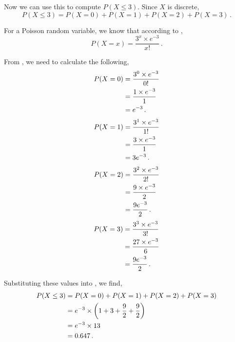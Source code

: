 \begin{subquestions}
\begin{subsubquestions}
Now we can use this to compute $P(X\leq3)$. Since $X$ is discrete, 
\begin{equation}
	P(X \leq 3) = P(X=0)+P(X=1)+P(X=2)+P(X=3) \,. \label{2005:q4:DisPois}
\end{equation}

For a Poisson random variable, we know that according to , 
\begin{equation}
	P(X = x) =\frac{ 3 ^ x \times e^{-3}}{x!} \,. \label{2005:q4:Pois1}
\end{equation}


From , we need to calculate the following,
\begin{align}
	P(X = 0) & = \frac{ 3 ^ 0 \times e^{-3}}{0!} \nonumber \\
	         & = \frac{ 1 \times e^{-3}}{1} \nonumber \\
	         & = e^{-3} \,. 
\end{align}
\begin{align}
	P(X = 1) & = \frac{ 3 ^ 1 \times e^{-3}}{1!} \nonumber \\
			 & = \frac{ 3 \times e^{-3}}{1} \nonumber \\
			 & = 3e^{-3} \,. 
\end{align}
\begin{align}
	P(X = 2) & = \frac{ 3 ^ 2 \times e^{-3}}{2!} \nonumber \\
			 & = \frac{ 9 \times e^{-3}}{2} \nonumber \\
			 & = \frac{9e^{-3}}{2} \,.
\end{align}
\begin{align}
	P(X = 3) & = \frac{ 3 ^ 3 \times e^{-3}}{3!} \nonumber \\
		  	 & = \frac{ 27 \times e^{-3}}{6} \nonumber \\
			 & = \frac{9e^{-3}}{2} \,. 
\end{align}

Substituting these values into , we find,
\begin{align}
	P(X \leq 3) & = P(X=0)+P(X=1)+P(X=2)+P(X=3) \nonumber \\
				& = e^{-3} \times \left(1+3+\frac{9}{2}+\frac{9}{2}\right) \nonumber \\
	            & = e^{-3} \times 13 \nonumber \\
	            & = 0.647 \,.
\end{align}

\end{subsubquestions}
	


\end{subquestions}
